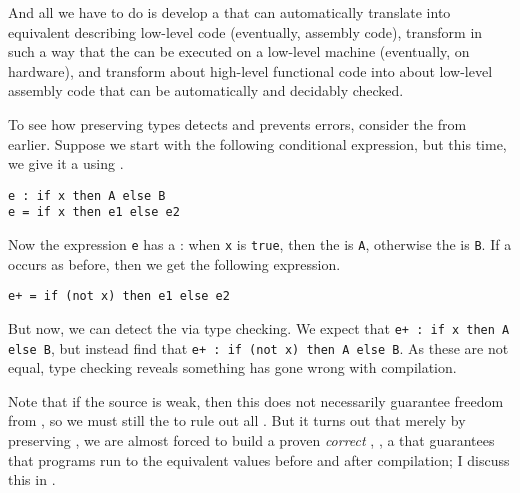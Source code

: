 And all we have to do is develop a  that can automatically
translate  into equivalent 
describing low-level code (eventually, assembly code), transform
 in such a way that the  can be executed on a
low-level machine (eventually, on hardware), and transform  about
high-level functional code into  about low-level assembly code that
can be automatically and decidably checked.

To see how preserving types detects and prevents errors, consider the
 from earlier.
Suppose we start with the following conditional expression, but this time, we
give it a  using .
\begin{verbatim}
e : if x then A else B
e = if x then e1 else e2
\end{verbatim}
Now the expression \texttt{e} has a : when
\texttt{x} is \texttt{true}, then the  is
\texttt{A}, otherwise the  is \texttt{B}.
If a  occurs as before, then we get the following
expression.
\begin{verbatim}
e+ = if (not x) then e1 else e2
\end{verbatim}
But now, we can detect the  via type
checking.
We expect that \texttt{e+ : if x then A else B}, but instead find that
\texttt{e+ : if (not x) then A else B}.
As these  are not equal, type checking reveals something has gone
wrong with compilation.

Note that if the source  is weak, then this does not
necessarily guarantee freedom from , so we must
still  the  to rule out all .
But it turns out that merely by preserving , we are
almost forced to build a proven \emph{correct} , \ie, a
 that guarantees that programs run to the equivalent values
before and after compilation; I discuss this in .

